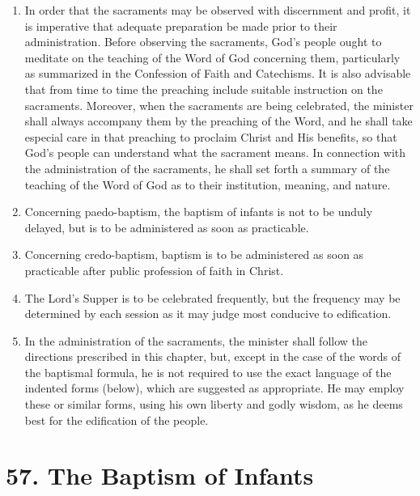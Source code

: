 \documentclass[
]{book}
\providecommand{\tightlist}{%
  \setlength{\itemsep}{0pt}\setlength{\parskip}{0pt}}
\begin{document}
\protect\hypertarget{chapter-slug-56-the-administration-of-the-sacraments-general-provisions}{\href{}{}}

\begin{enumerate}
\def\labelenumi{\arabic{enumi}.}
\tightlist
\item
  \protect\hypertarget{56}{\href{}{}}In order that the sacraments may be observed with discernment and profit, it is imperative that adequate preparation be made prior to their administration. Before observing the sacraments, God's people ought to meditate on the teaching of the Word of God concerning them, particularly as summarized in the Confession of Faith and Catechisms. It is also advisable that from time to time the preaching include suitable instruction on the sacraments. Moreover, when the sacraments are being celebrated, the minister shall always accompany them by the preaching of the Word, and he shall take especial care in that preaching to proclaim Christ and His benefits, so that God's people can understand what the sacrament means. In connection with the administration of the sacraments, he shall set forth a summary of the teaching of the Word of God as to their institution, meaning, and nature.
\item
  Concerning paedo-baptism, the baptism of infants is not to be unduly delayed, but is to be administered as soon as practicable.
\item
  Concerning credo-baptism, baptism is to be administered as soon as practicable after public profession of faith in Christ.
\item
  The Lord's Supper is to be celebrated frequently, but the frequency may be determined by each session as it may judge most conducive to edification.
\item
  In the administration of the sacraments, the minister shall follow the directions prescribed in this chapter, but, except in the case of the words of the baptismal formula, he is not required to use the exact language of the indented forms (below), which are suggested as appropriate. He may employ these or similar forms, using his own liberty and godly wisdom, as he deems best for the edification of the people.
\end{enumerate}

\hypertarget{the-baptism-of-infants}{%
\section*{57. The Baptism of Infants}\label{the-baptism-of-infants}}
\end{document}
